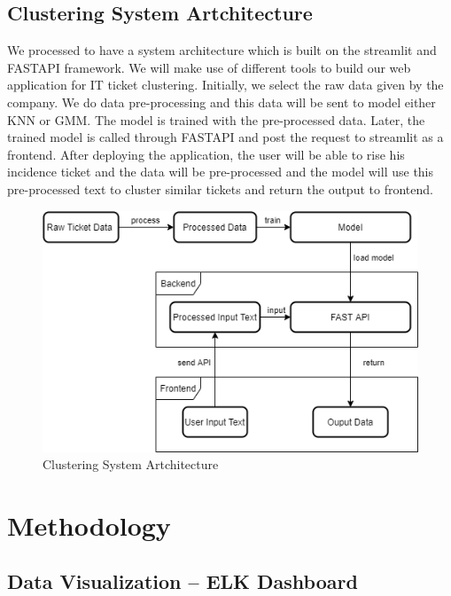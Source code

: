 \documentclass[a4paper,12pt]{report}
\begin{document}
    \section{Clustering System Artchitecture}
    We processed to have a system architecture which is built on the streamlit and FASTAPI framework. We will make use of different tools to build our web application for IT ticket clustering.
    \newline\newline
    Initially, we select the raw data given by the company. We do data pre-processing and this data will be sent to model either KNN or GMM. The model is trained with the pre-processed data. Later, the trained model is called through FASTAPI and post the request to streamlit as a frontend.
    After deploying the application, the user will be able to rise his incidence ticket and the data will be pre-processed and the model will use this pre-processed text to cluster similar tickets and return the output to frontend.
    \newline\newline
    \begin{figure}[!h]
        \includegraphics[width=\linewidth]{System's Artchitecture.png}
        \centering
        \caption{Clustering System Artchitecture}
    \end{figure}
    
    \chapter{Methodology}
    \section{Data Visualization – ELK Dashboard}
\end{document}
